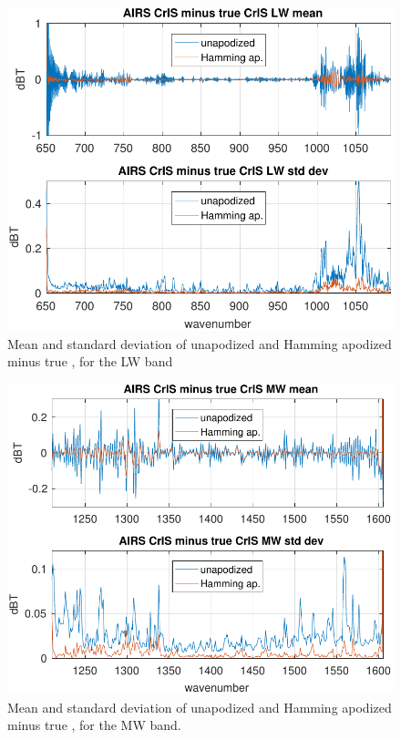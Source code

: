 \documentclass[10pt,twocolumn]{article}
\begin{document}
\begin{figure} %
  \centering
  \includegraphics[width=\linewidth]{figures/a2cris_diff_LW.pdf}
  \caption{Mean and standard deviation of unapodized and Hamming
    apodized {\airs} {\cris} minus true {\cris}, for the {\cris} LW
    band}
  \label{diffLW}
\end{figure}

\begin{figure} %
  \centering
  \includegraphics[width=\linewidth]{figures/a2cris_diff_MW.pdf}
  \caption{Mean and standard deviation of unapodized and Hamming
    apodized {\airs} {\cris} minus true {\cris}, for the {\cris} MW
    band.}
  \label{diffMW}
\end{figure}
\end{document}
